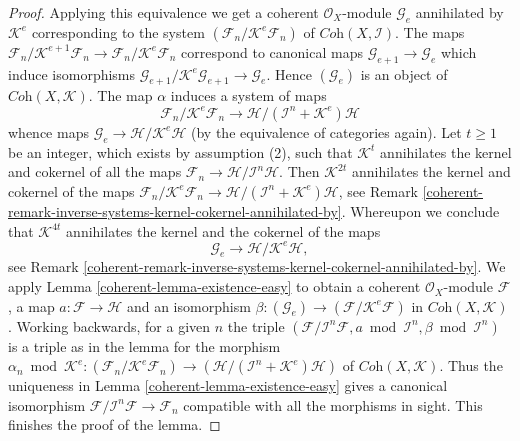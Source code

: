 \begin{proof}
\medskip\noindent
Applying this equivalence we get a coherent $\mathcal{O}_X$-module
$\mathcal{G}_e$ annihilated by $\mathcal{K}^e$ corresponding to the system
$(\mathcal{F}_n/\mathcal{K}^e\mathcal{F}_n)$ of
$\textit{Coh}(X, \mathcal{I})$. The maps
$\mathcal{F}_n/\mathcal{K}^{e + 1}\mathcal{F}_n \to
\mathcal{F}_n/\mathcal{K}^e\mathcal{F}_n$ correspond to canonical maps
$\mathcal{G}_{e + 1} \to \mathcal{G}_e$ which induce isomorphisms
$\mathcal{G}_{e + 1}/\mathcal{K}^e\mathcal{G}_{e + 1} \to \mathcal{G}_e$.
Hence $(\mathcal{G}_e)$ is an object of $\textit{Coh}(X, \mathcal{K})$.
The map $\alpha$ induces a system of maps
$$
\mathcal{F}_n/\mathcal{K}^e\mathcal{F}_n
\longrightarrow
\mathcal{H}/(\mathcal{I}^n + \mathcal{K}^e)\mathcal{H}
$$
whence maps $\mathcal{G}_e \to \mathcal{H}/\mathcal{K}^e\mathcal{H}$
(by the equivalence of categories again).
Let $t \geq 1$ be an integer, which exists by assumption (2),
such that $\mathcal{K}^t$ annihilates the kernel and cokernel of all the maps
$\mathcal{F}_n \to \mathcal{H}/\mathcal{I}^n\mathcal{H}$.
Then $\mathcal{K}^{2t}$ annihilates the kernel and cokernel of the maps
$\mathcal{F}_n/\mathcal{K}^e\mathcal{F}_n \to
\mathcal{H}/(\mathcal{I}^n + \mathcal{K}^e)\mathcal{H}$, see
Remark \ref{coherent-remark-inverse-systems-kernel-cokernel-annihilated-by}.
Whereupon we conclude that $\mathcal{K}^{4t}$ annihilates the kernel and
the cokernel of the maps
$$
\mathcal{G}_e
\longrightarrow
\mathcal{H}/\mathcal{K}^e\mathcal{H},
$$
see Remark \ref{coherent-remark-inverse-systems-kernel-cokernel-annihilated-by}.
We apply Lemma \ref{coherent-lemma-existence-easy} to obtain a coherent
$\mathcal{O}_X$-module $\mathcal{F}$, a map
$a : \mathcal{F} \to \mathcal{H}$ and an isomorphism
$\beta : (\mathcal{G}_e) \to (\mathcal{F}/\mathcal{K}^e\mathcal{F})$
in $\textit{Coh}(X, \mathcal{K})$. Working backwards, for a given $n$
the triple
$(\mathcal{F}/\mathcal{I}^n\mathcal{F}, a \bmod \mathcal{I}^n, \beta
\bmod \mathcal{I}^n)$ is a triple as in the lemma for the morphism
$\alpha_n \bmod \mathcal{K}^e :
(\mathcal{F}_n/\mathcal{K}^e\mathcal{F}_n) \to
(\mathcal{H}/(\mathcal{I}^n + \mathcal{K}^e)\mathcal{H})$
of $\textit{Coh}(X, \mathcal{K})$. Thus the uniqueness in
Lemma \ref{coherent-lemma-existence-easy}
gives a canonical isomorphism
$\mathcal{F}/\mathcal{I}^n\mathcal{F} \to \mathcal{F}_n$
compatible with all the morphisms in sight. This finishes the proof
of the lemma.
\end{proof}

